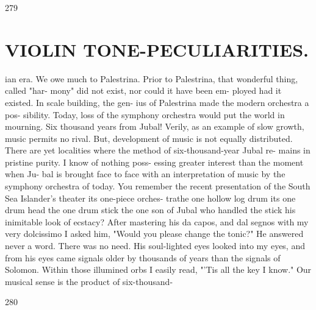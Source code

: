 \documentclass{article}
\begin{document}
279

\section*{VIOLIN TONE-PECULIARITIES.}
ian era. We owe much to Palestrina. Prior to Palestrina, that wonderful thing, called "har- mony" did not exist, nor could it have been em- ployed had it existed. In scale building, the gen- ius of Palestrina made the modern orchestra a pos- sibility. Today, loss of the symphony orchestra would put the world in mourning. Six thousand years from Jubal! Verily, as an example of slow growth, music permits no rival. But, development of music is not equally distributed. There are yet localities where the method of six-thousand-year Jubal re- mains in pristine purity. I know of nothing poss- essing greater interest than the moment when Ju- bal is brought face to face with an interpretation of music by the symphony orchestra of today. You remember the recent presentation of the South Sea Islander's theater its one-piece orches- trathe one hollow log drum its one drum head the one drum stick the one son of Jubal who handled the stick his inimitable look of ecstacy? After mastering his da capos, and dal segnos with my very dolcissimo I asked him, "Would you please change the tonic?" He answered never a word. There was no need. His soul-lighted eyes looked into my eyes, and from his eyes came signals older by thousands of years than the signals of Solomon. Within those illumined orbs I easily read, "'Tis all the key I know." Our musical sense is the product of six-thousand-

280
\end{document}
